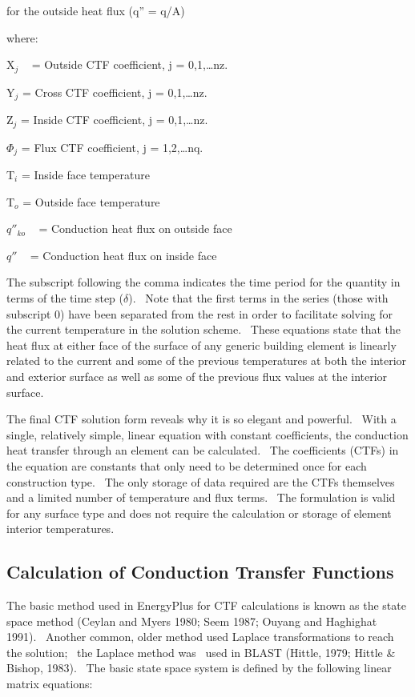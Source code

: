 for the outside heat flux (q'' = q/A)

where:

X\emph{\(_{j}\)} ~ = Outside CTF coefficient, j = 0,1,\ldots{}nz.

Y\emph{\(_{j}\)} = Cross CTF coefficient, j = 0,1,\ldots{}nz.

Z\emph{\(_{j}\)} = Inside CTF coefficient, j = 0,1,\ldots{}nz.

$\Phi$\emph{\(_{j}\)} = Flux CTF coefficient, j = 1,2,\ldots{}nq.

T\emph{\(_{i}\)} = Inside face temperature

T\emph{\(_{o}\)} = Outside face temperature

\({q''_{ko}}\) ~ = Conduction heat flux on outside face

\(q''\) ~ = Conduction heat flux on inside face

The subscript following the comma indicates the time period for the quantity in terms of the time step (\(\delta\)).~ Note that the first terms in the series (those with subscript 0) have been separated from the rest in order to facilitate solving for the current temperature in the solution scheme.~ These equations state that the heat flux at either face of the surface of any generic building element is linearly related to the current and some of the previous temperatures at both the interior and exterior surface as well as some of the previous flux values at the interior surface.

The final CTF solution form reveals why it is so elegant and powerful.~ With a single, relatively simple, linear equation with constant coefficients, the conduction heat transfer through an element can be calculated.~ The coefficients (CTFs) in the equation are constants that only need to be determined once for each construction type.~ The only storage of data required are the CTFs themselves and a limited number of temperature and flux terms.~ The formulation is valid for any surface type and does not require the calculation or storage of element interior temperatures.

\subsection{Calculation of Conduction Transfer Functions}\label{calculation-of-conduction-transfer-functions}

The basic method used in EnergyPlus for CTF calculations is known as the state space method (Ceylan and Myers 1980; Seem 1987; Ouyang and Haghighat 1991).~ Another common, older method used Laplace transformations to reach the solution;~ the Laplace method was~ used in BLAST (Hittle, 1979; Hittle \& Bishop, 1983).~ The basic state space system is defined by the following linear matrix equations:

